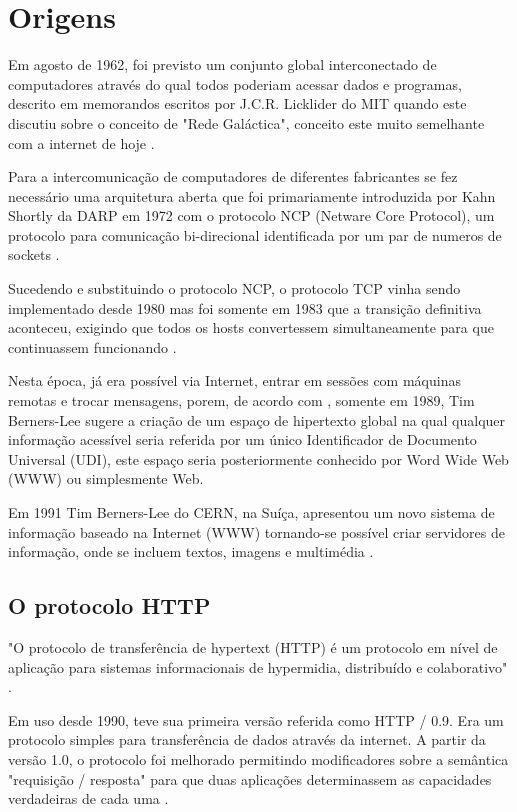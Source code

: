 \section{Origens}

Em agosto de 1962, foi previsto um conjunto global interconectado de computadores através do qual todos poderiam acessar dados e programas, descrito em memorandos escritos por J.C.R. Licklider do MIT quando este discutiu sobre o conceito de "Rede Galáctica", conceito este muito semelhante com a internet de hoje \cite[p.~2]{Leiner2009}.

Para a intercomunicação de computadores de diferentes fabricantes se fez necessário uma arquitetura aberta que foi primariamente introduzida por Kahn Shortly da DARP em 1972 com o protocolo NCP (Netware Core Protocol), um protocolo para comunicação bi-direcional identificada por um par de numeros de sockets \cite[p.~4]{Leiner2009}.

Sucedendo e substituindo o protocolo NCP, o protocolo TCP vinha sendo implementado desde 1980 mas foi somente em 1983 que a transição definitiva aconteceu, exigindo que todos os hosts convertessem simultaneamente para que continuassem funcionando \cite[p.~7]{Leiner2009}.

Nesta época, já era possível via Internet, entrar em sessões com máquinas remotas e trocar mensagens, porem, de acordo com , somente em 1989, Tim Berners-Lee sugere a criação de um espaço de hipertexto global na qual qualquer informação acessível seria referida por um único Identificador de Documento Universal (UDI), este espaço seria posteriormente conhecido por Word Wide Web (WWW) ou simplesmente Web.

 Em 1991 Tim Berners-Lee do CERN, na Suíça, apresentou um novo sistema de informação baseado na Internet (WWW) tornando-se possível criar servidores de informação, onde se incluem textos, imagens e multimédia \cite{goethals2000historia}.

\subsection{O protocolo HTTP}
"O protocolo de transferência de hypertext (HTTP) é um protocolo em nível de aplicação para sistemas informacionais de hypermidia, distribuído e colaborativo" \cite[p.~7, Tradução Nossa]{Fielding1999}.

Em uso desde 1990, teve sua primeira versão referida como HTTP / 0.9. Era um protocolo simples para transferência de dados através da internet. A partir da versão 1.0, o protocolo foi melhorado permitindo modificadores sobre a semântica "requisição / resposta" para que duas aplicações determinassem as capacidades verdadeiras de cada uma \cite[p.~7]{Fielding1999}.

